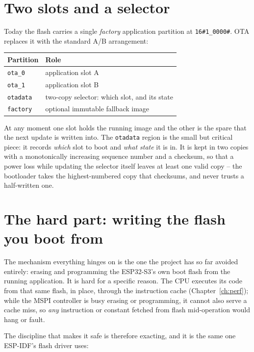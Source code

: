\section{Two slots and a selector}

Today the flash carries a single \emph{factory} application partition at
\texttt{16\#1\_0000\#}. OTA replaces it with the standard A/B arrangement:

\begin{center}
\begin{tabular}{l l}
\toprule
\textbf{Partition} & \textbf{Role} \\ \midrule
\texttt{ota\_0}   & application slot A \\
\texttt{ota\_1}   & application slot B \\
\texttt{otadata}  & two-copy selector: which slot, and its state \\
\texttt{factory}  & optional immutable fallback image \\
\bottomrule
\end{tabular}
\end{center}

At any moment one slot holds the running image and the other is the spare that the
next update is written into. The \texttt{otadata} region is the small but critical
piece: it records \emph{which} slot to boot and \emph{what state} it is in. It is
kept in two copies with a monotonically increasing sequence number and a checksum,
so that a power loss while updating the selector itself leaves at least one valid
copy -- the bootloader takes the highest-numbered copy that checksums, and never
trusts a half-written one.

\section{The hard part: writing the flash you boot from}

The mechanism everything hinges on is the one the project has so far avoided
entirely: erasing and programming the ESP32-S3's own boot flash from the running
application. It is hard for a specific reason. The CPU executes its code from that
same flash, in place, through the instruction cache (Chapter~\ref{ch:perf}); while
the MSPI controller is busy erasing or programming, it cannot also serve a cache
miss, so \emph{any} instruction or constant fetched from flash mid-operation would
hang or fault.

The discipline that makes it safe is therefore exacting, and it is the same one
ESP-IDF's flash driver uses:


